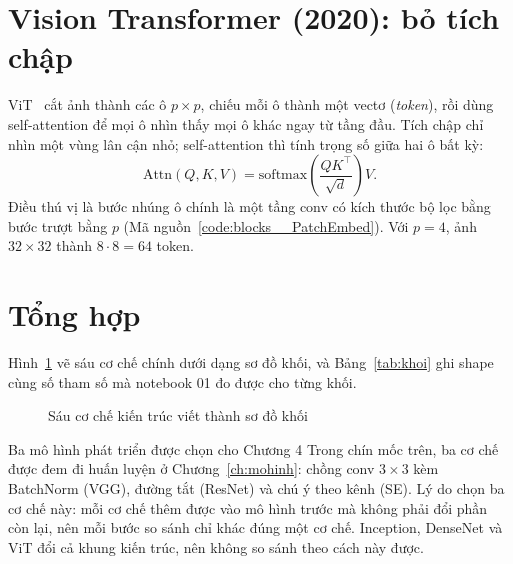 
\section{Vision Transformer (2020): bỏ tích chập}

ViT~\cite{dosovitskiy2021} cắt ảnh thành các ô $p\times p$, chiếu mỗi ô thành một vectơ (\emph{token}), rồi dùng
self-attention để mọi ô nhìn thấy mọi ô khác ngay từ tầng đầu. Tích chập chỉ nhìn một vùng lân cận nhỏ; self-attention thì
tính trọng số giữa hai ô bất kỳ:
\[
  \mathrm{Attn}(Q,K,V) = \mathrm{softmax}\!\left(\frac{QK^{\top}}{\sqrt{d}}\right)V .
\]
Điều thú vị là bước nhúng ô chính là một tầng conv có kích thước bộ lọc bằng bước trượt bằng $p$
(Mã nguồn~\ref{code:blocks__PatchEmbed}). Với $p=4$, ảnh $32\times32$ thành $8\cdot8=64$ token.


\section{Tổng hợp}

Hình~\ref{fig:coche} vẽ sáu cơ chế chính dưới dạng sơ đồ khối, và Bảng~\ref{tab:khoi} ghi shape cùng số tham số
mà notebook 01 đo được cho từng khối.

\begin{figure}[H]
  \centering
  \caption{Sáu cơ chế kiến trúc viết thành sơ đồ khối}
  \label{fig:coche}
\end{figure}

\begin{table}[H]
  \centering
  \caption{Shape và số tham số của các khối minh hoạ (notebook 01, tensor giả, lô 2)}
  \label{tab:khoi}
  
\end{table}

\begin{phathien}{Ba mô hình phát triển được chọn cho Chương 4}
Trong chín mốc trên, ba cơ chế được đem đi huấn luyện ở Chương~\ref{ch:mohinh}: chồng conv $3\times3$ kèm
BatchNorm (VGG), đường tắt (ResNet) và chú ý theo kênh (SE). Lý do chọn ba cơ chế này: mỗi cơ chế thêm được
vào mô hình trước mà không phải đổi phần còn lại, nên mỗi bước so sánh chỉ khác đúng một cơ chế.
Inception, DenseNet và ViT đổi cả khung kiến trúc, nên không so sánh theo cách này được.
\end{phathien}
